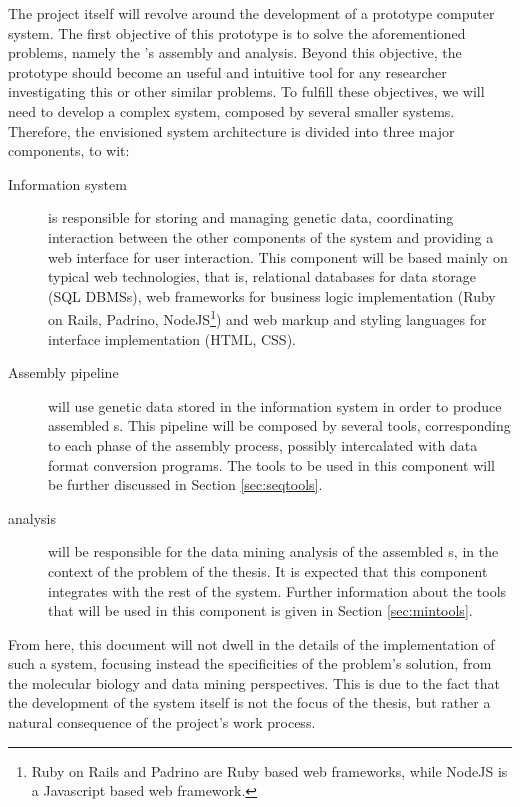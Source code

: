 The project itself will revolve around the development of a prototype computer
system. The first objective of this prototype is to solve the aforementioned
problems, namely the \trans 's assembly and analysis. Beyond this objective, the
prototype should become an useful and intuitive tool for any researcher
investigating this or other similar problems. To fulfill these objectives, we
will need to develop a complex system, composed by several smaller systems.
Therefore, the envisioned system architecture is divided into three major
components, to wit:

\begin{description}

  \item[Information system]
  is responsible for storing and managing genetic data, coordinating interaction
  between the other components of the system and providing a web interface for
  user interaction. This component will be based mainly on typical web
  technologies, that is, relational databases for data storage (SQL DBMSs), web
  frameworks for business logic implementation (Ruby on Rails, Padrino,
  NodeJS\footnote{Ruby on Rails and Padrino are Ruby based web frameworks, while
  NodeJS is a Javascript based web framework.}) and web markup and styling
  languages for interface implementation (HTML, CSS).

  \item[Assembly pipeline]
  will use genetic data stored in the information system in order to produce
  assembled \trans s. This pipeline will be composed by several tools,
  corresponding to each phase of the assembly process, possibly intercalated
  with data format conversion programs. The tools to be used in this component
  will be further discussed in Section \ref{sec:seqtools}.

  \item[\Trans{} analysis]
  will be responsible for the data mining analysis of the assembled \trans s, in
  the context of the problem of the thesis. It is expected that this component
  integrates with the rest of the system. Further information about the tools
  that will be used in this component is given in Section \ref{sec:mintools}.

\end{description}

From here, this document will not dwell in the details of the implementation of
such a system, focusing instead the specificities of the problem's solution,
from the molecular biology and data mining perspectives. This is due to the fact
that the development of the system itself is not the focus of the thesis, but
rather a natural consequence of the project's work process.

